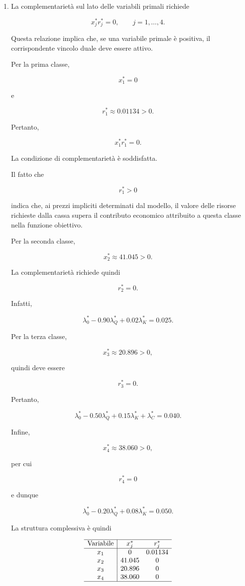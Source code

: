 \begin{enumerate}
\item La complementariet\`a sul lato delle variabili primali richiede

\[
x_j^*r_j^*
=
0,
\qquad
j=1,\ldots,4.
\]

Questa relazione implica che, se una variabile primale \`e positiva, il
corrispondente vincolo duale deve essere attivo.

Per la prima classe,

\[
x_1^*=0
\]

e

\[
r_1^*
\approx
0.01134>0.
\]

Pertanto,

\[
x_1^*r_1^*
=
0.
\]

La condizione di complementariet\`a \`e soddisfatta.

Il fatto che

\[
r_1^*>0
\]

indica che, ai prezzi impliciti determinati dal modello, il valore delle
risorse richieste dalla cassa supera il contributo economico attribuito a
questa classe nella funzione obiettivo.

Per la seconda classe,

\[
x_2^*
\approx
41.045>0.
\]

La complementariet\`a richiede quindi

\[
r_2^*=0.
\]

Infatti,

\[
\lambda_0^*
-
0.90\lambda_Q^*
+
0.02\lambda_K^*
=
0.025.
\]

Per la terza classe,

\[
x_3^*
\approx
20.896>0,
\]

quindi deve essere

\[
r_3^*=0.
\]

Pertanto,

\[
\lambda_0^*
-
0.50\lambda_Q^*
+
0.15\lambda_K^*
+
\lambda_C^*
=
0.040.
\]

Infine,

\[
x_4^*
\approx
38.060>0,
\]

per cui

\[
r_4^*=0
\]

e dunque

\[
\lambda_0^*
-
0.20\lambda_Q^*
+
0.08\lambda_K^*
=
0.050.
\]

La struttura complessiva \`e quindi

\[
\begin{array}{c|cc}
\hline
\text{Variabile}
&
x_j^*
&
r_j^*
\\
\hline
x_1
&
0
&
0.01134
\\
x_2
&
41.045
&
0
\\
x_3
&
20.896
&
0
\\
x_4
&
38.060
&
0
\\
\hline
\end{array}
\]


\end{enumerate}

